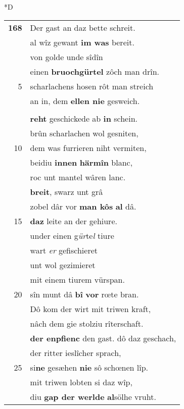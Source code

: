\documentclass[8pt,a4paper,notitlepage]{article}
\begin{document}
\begin{table}[ht]
\begin{minipage}[t]{0.5\linewidth}
\small
\begin{center}*D
\end{center}
\begin{tabular}{rl}
\textbf{168} & Der gast an daz bette schreit.\\ 
 & al wîz gewant \textbf{im was} bereit.\\ 
 & von golde unde sîdîn\\ 
 & einen \textbf{bruochgürtel} zôch man drîn.\\ 
5 & scharlachens hosen rôt man streich\\ 
 & an in, dem \textbf{ellen nie} gesweich.\\ 
 & \textit{\begin{large}Â\end{large}}voy, wie stuonden sîniu bein!\\ 
 & \textbf{reht} geschickede ab \textbf{in} schein.\\ 
 & brûn scharlachen wol gesniten,\\ 
10 & dem was furrieren niht vermiten,\\ 
 & beidiu \textbf{innen} \textbf{härmîn} blanc,\\ 
 & roc unt mantel wâren lanc.\\ 
 & \textbf{breit}, swarz unt grâ\\ 
 & zobel dâr vor \textbf{man kôs} \textbf{al} dâ.\\ 
15 & \textbf{daz} leite an der gehiure.\\ 
 & under einen g\textit{ür}te\textit{l} tiure\\ 
 & wart \textit{er} gefischieret\\ 
 & unt wol gezimieret\\ 
 & mit einem tiurem vürspan.\\ 
20 & sîn munt dâ \textbf{bî} \textbf{vor} rœte bran.\\ 
 & Dô kom der wirt mit triwen kraft,\\ 
 & nâch dem gie stolziu rîterschaft.\\ 
 & \textbf{der enpfienc} den gast. dô daz geschach,\\ 
 & der ritter ieslîcher sprach,\\ 
25 & si\textbf{ne} gesæhen \textbf{nie} sô schœnen lîp.\\ 
 & mit triwen lobten si daz wîp,\\ 
 & diu \textbf{gap der werlde} \textbf{al}sölhe vruht.\\ 

\end{tabular}
\end{minipage}
\end{table}
\end{document}
